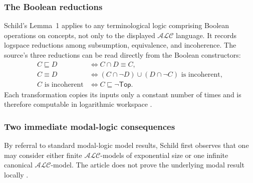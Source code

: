 \subsubsection{The Boolean reductions}

Schild's Lemma~1 applies to any terminological logic comprising Boolean
operations on concepts, not only to the displayed \(\mathcal{ALC}\) language.
It records logspace reductions among subsumption, equivalence, and incoherence.
The source's three reductions can be read directly from the Boolean
constructors:
\[
\begin{aligned}
 C\sqsubseteq D
 &\Longleftrightarrow C\cap D\equiv C,\\
 C\equiv D
 &\Longleftrightarrow
   (C\cap\neg D)\cup(D\cap\neg C)
   \text{ is incoherent},\\
 C\text{ is incoherent}
 &\Longleftrightarrow C\sqsubseteq\neg\mathsf{Top}.
\end{aligned}
\]
Each transformation copies its inputs only a constant number of times and is
therefore computable in logarithmic workspace
\cite[lem.~1, p.~467]{Schild1991}.

\subsubsection{Two immediate modal-logic consequences}

By referral to standard modal-logic model results, Schild first observes that
one may consider either finite \(\mathcal{ALC}\)-models of exponential size or
one infinite canonical \(\mathcal{ALC}\)-model.  The article does not prove the
underlying modal result locally \cite[p.~468]{Schild1991}.


